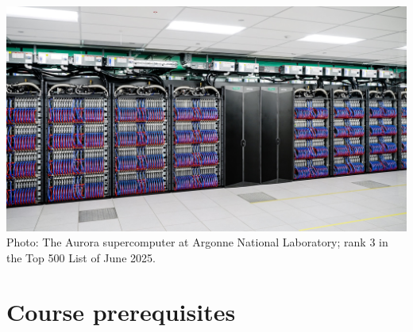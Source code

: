 \documentclass[12pt]{article}
\begin{document}
\noindent
\includegraphics[width=\linewidth]{1920x1080-Aurora hero image.jpg}
Photo: The Aurora supercomputer at Argonne National Laboratory; %
rank 3 in the Top 500 List of June 2025.

\section{Course prerequisites}
\end{document}
